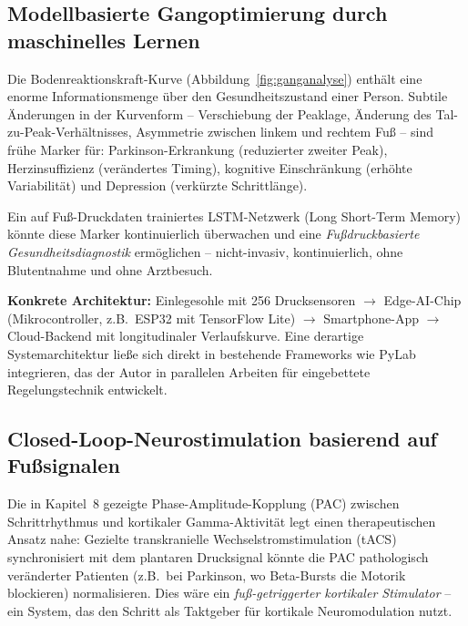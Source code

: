 ﻿\documentclass[12pt,a4paper]{report}
\theoremstyle{plain}
\theoremstyle{definition}
\theoremstyle{remark}
\begin{document}
\subsection{Modellbasierte Gangoptimierung durch maschinelles Lernen}

Die Bodenreaktionskraft-Kurve (Abbildung~\ref{fig:ganganalyse})
enthält eine enorme Informationsmenge über den Gesundheitszustand
einer Person. Subtile Änderungen in der Kurvenform -- Verschiebung
der Peaklage, Änderung des Tal-zu-Peak-Verhältnisses, Asymmetrie
zwischen linkem und rechtem Fuß -- sind frühe Marker für:
Parkinson-Erkrankung (reduzierter zweiter Peak), Herzinsuffizienz
(verändertes Timing), kognitive Einschränkung (erhöhte Variabilität)
und Depression (verkürzte Schrittlänge).

Ein auf Fuß-Druckdaten trainiertes LSTM-Netzwerk (Long Short-Term
Memory) könnte diese Marker kontinuierlich überwachen und eine
\emph{Fußdruckbasierte Gesundheitsdiagnostik} ermöglichen --
nicht-invasiv, kontinuierlich, ohne Blutentnahme und ohne
Arztbesuch.

\textbf{Konkrete Architektur:} Einlegesohle mit 256
Drucksensoren $\to$ Edge-AI-Chip (Mikrocontroller, z.B.\ ESP32 mit
TensorFlow Lite) $\to$ Smartphone-App $\to$ Cloud-Backend mit
longitudinaler Verlaufskurve. Eine derartige Systemarchitektur
ließe sich direkt in bestehende Frameworks wie PyLab integrieren,
das der Autor in parallelen Arbeiten für eingebettete
Regelungstechnik entwickelt.

\subsection{Closed-Loop-Neurostimulation basierend auf Fußsignalen}

Die in Kapitel~8 gezeigte Phase-Amplitude-Kopplung (PAC) zwischen
Schrittrhythmus und kortikaler Gamma-Aktivität legt einen
therapeutischen Ansatz nahe: Gezielte transkranielle
Wechselstromstimulation (tACS) synchronisiert mit dem plantaren
Drucksignal könnte die PAC pathologisch veränderter Patienten
(z.B.\ bei Parkinson, wo Beta-Bursts die Motorik blockieren)
normalisieren. Dies wäre ein \emph{fuß-getriggerter kortikaler
Stimulator} -- ein System, das den Schritt als Taktgeber für
kortikale Neuromodulation nutzt.

\end{document}
